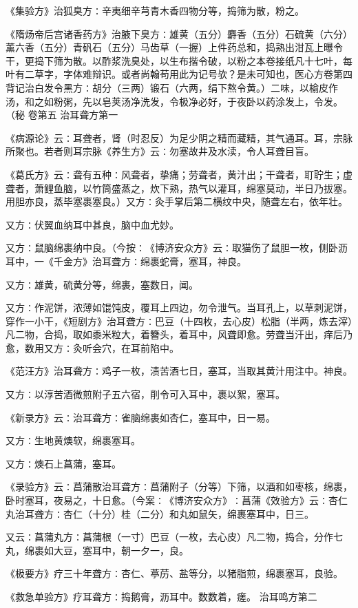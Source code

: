 \documentclass[a4paper,12pt,UTF8,twoside]{ctexbook}
\begin{document}
《集验方》治狐臭方∶辛夷细辛芎青木香四物分等，捣筛为散，粉之。

《隋炀帝后宫诸香药方》治腋下臭方∶雄黄（五分）麝香（五分）石硫黄（六分）薰六香（五分）青矾石（五分）马齿草（一握）上件药总和，捣熟出泔瓦上曝令干，更捣下筛为散。以酢浆洗臭处，以生布揩令破，以粉之本卷接纸凡十七叶，每叶有二草字，字体难辩识。或者尚翰苟用此为记号欤？是未可知也，医心方卷第四背记治白发令黑方∶胡分（三两）锻石（六两，绢下熬令黄。）二味，以榆皮作汤，和之如粉粥，先以皂荚汤净洗发，令极净必好，于夜卧以药涂发上，令发。（秘
卷第五
治耳聋方第一

《病源论》云∶耳聋者，肾（时忍反）为足少阴之精而藏精，其气通耳。耳，宗脉所聚也。若者则耳宗脉《养生方》云∶勿塞故井及水渎，令人耳聋目盲。

《葛氏方》云∶聋有五种∶风聋者，挚痛；劳聋者，黄汁出；干聋者，耵聍生；虚聋者，萧鲤鱼脑，以竹筒盛蒸之，炊下熟，热气以灌耳，绵塞莫动，半日乃拔塞。用胆亦良，蒸毕塞裹塞良。）又方∶灸手掌后第二横纹中央，随聋左右，依年壮。

又方∶伏翼血纳耳中甚良，脑中血尤妙。

又方∶鼠脑绵裹纳中良。（今按∶《博济安众方》云∶取猫伤了鼠胆一枚，侧卧沥耳中，一《千金方》治耳聋方∶绵裹蛇膏，塞耳，神良。

又方∶雄黄，硫黄分等，绵裹，塞数日，闻。

又方∶作泥饼，浓薄如馄饨皮，覆耳上四边，勿令泄气。当耳孔上，以草刺泥饼，穿作一小干，《短剧方》治耳聋方∶巴豆（十四枚，去心皮）松脂（半两，炼去滓）凡二物，合捣，取如黍米粒大，着簪头，着耳中，风聋即愈。劳聋当汗出，痒后乃愈，数用又方∶灸听会穴，在耳前陷中。

《范汪方》治耳聋方∶鸡子一枚，渍苦酒七日，塞耳，当取其黄汁用注中。神良。

又方∶以淳苦酒微煎附子五六宿，削令可入耳中，裹以絮，塞耳。

《新录方》云∶治耳聋方∶雀脑绵裹如杏仁，塞耳中，日一易。

又方∶生地黄燠软，绵裹塞耳。

又方∶燠石上菖蒲，塞耳。

《录验方》云∶菖蒲散治耳聋方∶菖蒲附子（分等）下筛，以酒和如枣核，绵裹，卧时塞耳，夜易之，十日愈。（今案∶《博济安众方》∶菖蒲《效验方》云∶杏仁丸治耳聋方∶杏仁（十分）桂（二分）和丸如鼠矢，绵裹塞耳中，日三。

又云∶菖蒲丸方∶菖蒲根（一寸）巴豆（一枚，去心皮）凡二物，捣合，分作七丸，绵裹如大豆，塞耳中，朝一夕一，良。

《极要方》疗三十年聋方∶杏仁、葶苈、盐等分，以猪脂煎，绵裹塞耳，良验。

《救急单验方》疗耳聋方∶捣鹅膏，沥耳中。数数着，瘥。
治耳鸣方第二
\end{document}
